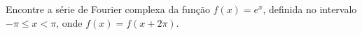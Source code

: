 \linespread{1.5}
Encontre a série de Fourier complexa da função $f(x) = e^x$, definida no intervalo $-\pi \leq x < \pi$, onde $f(x) = f(x+2\pi)$.